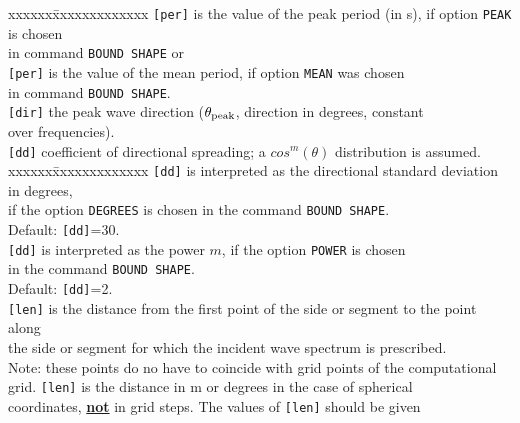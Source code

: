 \documentclass[12pt]{book}
\begin{document}
\begin{tabbing}
                        \pushtabs
                        xxxxxx\=xxxxxxxxxxxxx \kill
                        {\tt [per]} \> is the value of the peak period (in s), if option {\tt PEAK} is chosen\+\\
                                       in command {\tt BOUND SHAPE} or\-\\
                        {\tt [per]} \> is the value of the mean period, if option {\tt MEAN} was chosen\+\\
                                       in command {\tt BOUND SHAPE}.\-\-\\
                        \poptabs
{\tt [dir]}          \> the peak wave direction ($\theta_{\rm peak}$, direction in degrees, constant\+\\
                        over frequencies).\-\\
{\tt [dd]}           \> coefficient of directional spreading; a $cos^m(\theta)$ distribution is assumed.\+\\
                        \pushtabs
                        xxxxxx\=xxxxxxxxxxxxx \kill
                        {\tt [dd]} \> is interpreted as the directional standard deviation in degrees,\+\\
                                      if the option {\tt DEGREES} is chosen in the command {\tt BOUND SHAPE}.\\
                                      Default: {\tt [dd]}=30.\-\\
                        {\tt [dd]} \> is interpreted as the power $m$, if the option {\tt POWER} is chosen\+\\
                                      in the command {\tt BOUND SHAPE}.\\
                                      Default: {\tt [dd]}=2.\-\-\\
                        \poptabs
{\tt [len]}          \> is the distance from the first point of the side or segment to the point along\+\\
                        the side or segment for which the incident wave spectrum is prescribed.\\
                        Note: these points do no have to coincide with grid points of the computational\\
                        grid. {\tt [len]} is the distance in m or degrees in the case of spherical\\
                        coordinates, \underline{{\bf not}} in grid steps. The values of {\tt [len]} should be given\\

\end{tabbing}
\end{document}
